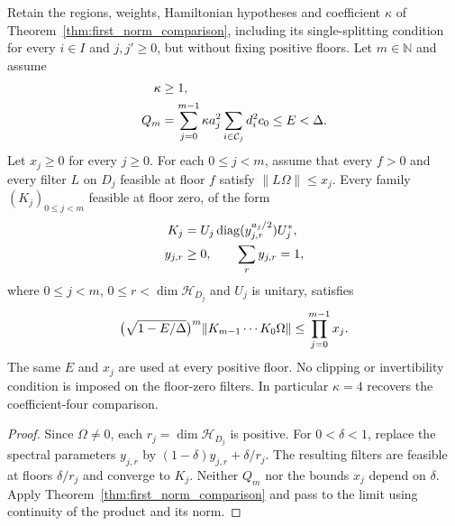 \begin{theorem}
    \label{thm:zero_floor_comparison}
    \leanok
    Retain the regions, weights, Hamiltonian hypotheses and coefficient
    $\kappa$ of Theorem~\ref{thm:first_norm_comparison}, including its
    single-splitting condition for every $i\in I$ and $j,j'\ge0$, but
    without fixing positive floors. Let $m\in\mathbb N$ and assume
    \begin{align}
        \kappa & \ge1,\notag                   \\
        Q_m    & =\sum_{j=0}^{m-1}\kappa a_j^2
        \sum_{i\in\mathcal C_j}d_i^2c_0\le E<\Delta.\notag
    \end{align}
    Let $x_j\ge0$ for every $j\ge0$. For each $0\le j<m$, assume
    that every $f>0$ and every filter $L$ on $D_j$ feasible at floor $f$
    satisfy $\lVert L\Omega\rVert\le x_j$.
    Every family $(K_j)_{0\le j<m}$ feasible at floor zero, of the form
    \begin{align}
        K_j     & =U_j\operatorname{diag}(y_{j,r}^{a_j/2})U_j^*,\notag \\
        y_{j,r} & \ge0,\qquad\sum_r y_{j,r}=1,\notag
    \end{align}
    where $0\le j<m$, $0\le r<\dim\mathcal H_{D_j}$ and $U_j$ is unitary, satisfies
    \begin{align}
        \bigl(\sqrt{1-E/\Delta}\bigr)^m
        \lVert K_{m-1}\cdots K_0\Omega\rVert
        \le\prod_{j=0}^{m-1}x_j.\notag
    \end{align}
    The same $E$ and $x_j$ are used at every positive floor. No clipping
    or invertibility condition is imposed on the floor-zero filters.
    In particular $\kappa=4$ recovers the coefficient-four comparison.
\end{theorem}
\begin{proof}
    \leanok
    Since $\Omega\ne0$, each $r_j=\dim\mathcal H_{D_j}$ is positive.
    For $0<\delta<1$, replace the
    spectral parameters $y_{j,r}$ by $(1-\delta)y_{j,r}+\delta/r_j$.
    The resulting filters are feasible at floors $\delta/r_j$ and converge
    to $K_j$. Neither $Q_m$ nor the bounds $x_j$ depend on $\delta$.
    Apply Theorem~\ref{thm:first_norm_comparison} and pass to the limit
    using continuity of the product and its norm.
\end{proof}


